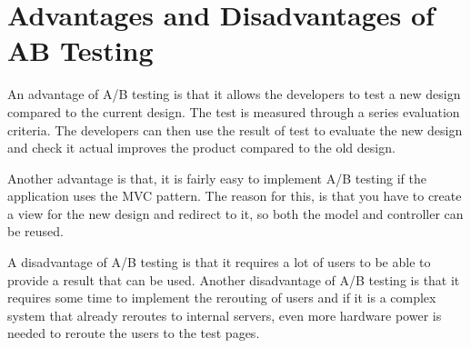 \section{Advantages and Disadvantages of AB Testing}
An advantage of A/B testing is that it allows the developers to test a new design compared to the current design. The test is measured through a series evaluation criteria. The developers can then use the result of test to evaluate the new design and check it actual improves the product compared to the old design.

Another advantage is that, it is fairly easy to implement A/B testing if the application uses the MVC pattern. The reason for this, is that you have to create a view for the new design and redirect to it, so both the model and controller can be reused.

A disadvantage of A/B testing is that it requires a lot of users to be able to provide a result that can be used. Another disadvantage of A/B testing is that it requires some time to implement the rerouting of users and if it is a complex system that already reroutes to internal servers, even more hardware power is needed to reroute the users to the test pages. 